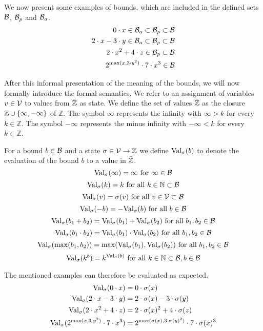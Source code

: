 We now present some examples of bounds, which are included in the defined sets $\mathcal{B}$, $\mathcal{B}_p$ and $\mathcal{B}_a$.
\begin{align*}
  0 \cdot x \in \mathcal{B}_a \subset \mathcal{B}_p \subset \mathcal{B} \\
  2 \cdot x - 3 \cdot y \in \mathcal{B}_a \subset \mathcal{B}_p \subset \mathcal{B} \\
  2 \cdot x^2 + 4 \cdot z \in \mathcal{B}_p \subset \mathcal{B} \\
  2^{\max(x,3 \cdot y^2)} \cdot 7 \cdot x^3 \in \mathcal{B}
\end{align*}

After this informal presentation of the meaning of the bounds, we will now formally introduce the formal semantics.
We refer to an assignment of variables $v \in \mathcal{V}$ to values from $\bar{\mathbb{Z}}$ as state.
We define the set of values $\bar{\mathbb{Z}}$ as the closure $\mathbb{Z} \cup \lbrace \infty, -\infty \rbrace$ of $\mathbb{Z}$.
The symbol $\infty$ represents the infinity with $\infty > k$ for every $k \in \mathbb{Z}$.
The symbol $-\infty$ represents the minus infinity with $-\infty < k$ for every $k \in \mathbb{Z}$.

\begin{definition}
  For a bound $b \in \mathcal{B}$ and a state $\sigma \in \mathcal{V} \rightarrow \mathbb{Z}$ we define $\text{Val}_{\sigma}(b)$ to denote the evaluation of the bound $b$ to a value in $\bar{\mathbb{Z}}$.
  \[ \text{Val}_{\sigma}(\infty) = \infty \text{ for } \infty \in \mathcal{B} \]
  \[ \text{Val}_{\sigma}(k) = k \text{ for all } k \in \mathbb{N} \subset \mathcal{B} \] 
  \[ \text{Val}_{\sigma}(v) = \sigma(v) \text{ for all } v \in \mathcal{V} \subset \mathcal{B} \] 
  \[ \text{Val}_{\sigma}(-b) = -\text{Val}_{\sigma}(b) \text{ for all } b \in \mathcal{B} \] 
  \[ \text{Val}_{\sigma}(b_1 + b_2) = \text{Val}_{\sigma}(b_1) + \text{Val}_{\sigma}(b_2) \text{ for all } b_1, b_2 \in \mathcal{B} \] 
  \[ \text{Val}_{\sigma}(b_1 \cdot b_2) = \text{Val}_{\sigma}(b_1) \cdot \text{Val}_{\sigma}(b_2) \text{ for all } b_1, b_2 \in \mathcal{B} \] 
  \[ \text{Val}_{\sigma}(\max(b_1, b_2)) = \max(\text{Val}_{\sigma}(b_1), \text{Val}_{\sigma}(b_2)) \text{ for all } b_1, b_2 \in \mathcal{B} \]
  \[ \text{Val}_{\sigma}(k^b) = k^{\text{Val}_{\sigma}(b)} \text{ for all } k \in \mathbb{N} \subset \mathcal{B}, b \in \mathcal{B} \]  
\end{definition}
The mentioned examples can therefore be evaluated as expected.
\begin{align*}
  \text{Val}_{\sigma}(0 \cdot x) &= 0 \cdot \sigma(x) \\
  \text{Val}_{\sigma}(2 \cdot x - 3 \cdot y) &= 2 \cdot \sigma(x) - 3 \cdot \sigma(y) \\
  \text{Val}_{\sigma}(2 \cdot x^2 + 4 \cdot z) &= 2 \cdot \sigma(x)^2 + 4 \cdot \sigma(z) \\
  \text{Val}_{\sigma}(2^{\max(x,3 \cdot y^2)} \cdot 7 \cdot x^3) &= 2^{\max(\sigma(x),3 \cdot \sigma(y)^2)} \cdot 7 \cdot \sigma(x)^3
\end{align*}

